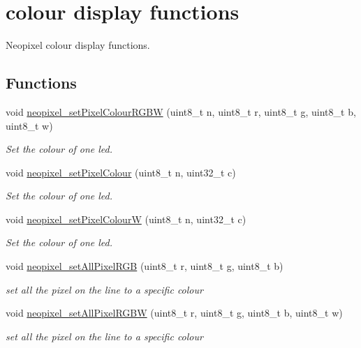 \hypertarget{group___display}{}\section{colour display functions}
\label{group___display}


Neopixel colour display functions.  


\subsection*{Functions}
\begin{DoxyCompactItemize}
\item 
void \hyperlink{group___display_ga58d5ceb79029ca8dc5dd8b27b65e4f09}{neopixel\+\_\+set\+Pixel\+Colour\+R\+G\+BW} (uint8\+\_\+t n, uint8\+\_\+t r, uint8\+\_\+t g, uint8\+\_\+t b, uint8\+\_\+t w)
\begin{DoxyCompactList}\small\item\em Set the colour of one led. \end{DoxyCompactList}\item 
void \hyperlink{group___display_gaecbdecac1da356c5fba07058983d9066}{neopixel\+\_\+set\+Pixel\+Colour} (uint8\+\_\+t n, uint32\+\_\+t c)
\begin{DoxyCompactList}\small\item\em Set the colour of one led. \end{DoxyCompactList}\item 
void \hyperlink{group___display_ga4daf6edfe83394f425ec51f64d92c49c}{neopixel\+\_\+set\+Pixel\+ColourW} (uint8\+\_\+t n, uint32\+\_\+t c)
\begin{DoxyCompactList}\small\item\em Set the colour of one led. \end{DoxyCompactList}\item 
void \hyperlink{group___display_ga7a6c2dc149e86a788aede1d6aa5262d7}{neopixel\+\_\+set\+All\+Pixel\+R\+GB} (uint8\+\_\+t r, uint8\+\_\+t g, uint8\+\_\+t b)
\begin{DoxyCompactList}\small\item\em set all the pixel on the line to a specific colour \end{DoxyCompactList}\item 
void \hyperlink{group___display_ga1ba017c1f338ef2c8e4a48acae35d87e}{neopixel\+\_\+set\+All\+Pixel\+R\+G\+BW} (uint8\+\_\+t r, uint8\+\_\+t g, uint8\+\_\+t b, uint8\+\_\+t w)
\begin{DoxyCompactList}\small\item\em set all the pixel on the line to a specific colour \end{DoxyCompactList}\end{DoxyCompactItemize}


